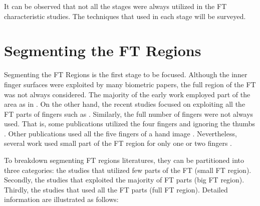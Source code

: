 \documentclass[review]{elsarticle}
\begin{document}
	It can be observed that not all the stages were always utilized in the FT characteristic studies. The techniques that used in each stage will be surveyed.

\section{Segmenting the FT Regions}
\label{Sec:Seg}
	Segmenting the FT Regions is the first stage to be focused. Although the inner finger surfaces were exploited by many biometric papers, the full region of the FT was not always considered. The majority of the early work employed part of the area as in \cite{Ribaric2005Anonline,Ribaric2005ABiometric,Ferrer2007Low,ying2007identity,Pavesic2009Finger-based}. On the other hand, the recent studies focused on exploiting all the FT parts of fingers such as \cite{Al-Nima2015Human,Al-Nima2017Robust,Al-Nima2017efficient}. Similarly, the full number of fingers were not always used. That is, some publications utilized the four fingers and ignoring the thumbs \cite{Ribaric2005Anonline,Ferrer2007Low,Pavesic2009Finger-based,michael2010innovative,Kanhangad2011AUnified,Al-Nima2015Human}. Other publications used all the five fingers of a hand image \cite{Ribaric2005ABiometric,ying2007identity,Goh2010Bi-modal,Michael2010Robust,Al-Nima2017Robust,Al-Nima2017efficient}. Nevertheless, several work used small part of the FT region for only one or two fingers \cite{kumar2011contactless,Kumar2012Human,zhang2012hand,stein2013video,sankaran2015Onsmartphone,malhotra2017fingerphoto}.

	To breakdown segmenting FT regions literatures, they can be partitioned into three categories: the studies that utilized few parts of the FT (small FT region). Secondly, the studies that exploited the majority of FT parts (big FT region). Thirdly, the studies that used all the FT parts (full FT region). Detailed information are illustrated as follows:
\end{document}
